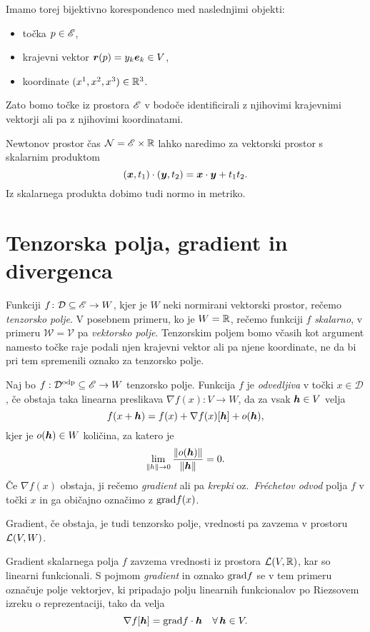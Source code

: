 Imamo torej bijektivno korespondenco med naslednjimi objekti:
\begin{itemize}
	\item točka $p\in\mathscr E$,
	\item krajevni vektor $\boldsymbol r(p)=y_k\boldsymbol e_k\in V$,
	\item koordinate $(x^1,x^2,x^3)\in\mathbb R^3$.
\end{itemize}
Zato bomo točke iz prostora $\mathscr E$ v bodoče identificirali z njihovimi krajevnimi vektorji ali pa z njihovimi koordinatami.

Newtonov prostor čas $\mathcal{N}=\mathscr E\times\mathbb R$ lahko naredimo za vektorski prostor s skalarnim produktom
\[ (\boldsymbol x,t_1)\cdot(\boldsymbol y,t_2) = \boldsymbol x\cdot\boldsymbol y + t_1 t_2. \]
Iz skalarnega produkta dobimo tudi normo in metriko.


\section{Tenzorska polja, gradient in divergenca}


Funkciji $f\colon\mathcal{D}\subseteq\mathscr E\to W$, kjer je $W$ neki normirani vektorski prostor, rečemo
\emph{tenzorsko polje}. V posebnem primeru, ko je $W=\mathbb R$, rečemo funkciji $f$ \emph{skalarno},
v primeru $\mathscr{W}=\mathscr{V}$ pa \emph{vektorsko polje}. Tenzorskim poljem bomo včasih kot argument namesto točke raje
podali njen krajevni vektor ali pa njene koordinate, ne da bi pri tem spremenili oznako za tenzorsko polje.

\begin{definicija}
	Naj bo $f:\mathcal{D}^{\mathrm{odp}}\subseteq\mathscr E\to W$ tenzorsko polje. Funkcija $f$ je \emph{odvedljiva}
	v točki $x\in\mathcal{D}$, če obstaja taka linearna preslikava $\nabla f(x):V\to W$, da za vsak $\boldsymbol h\in V$ velja
	\begin{equation*}
		f(x+\boldsymbol h)=f(x)+\nabla f(x)[\boldsymbol h]+o(\boldsymbol h),
	\end{equation*}
	kjer je $o(\boldsymbol h)\in W$ količina, za katero je
	\[ \lim_{\| h\|\to 0}\frac{\|o(\boldsymbol h)\|}{\|\boldsymbol h\|}=0. \]
	Če $\nabla f(x)$ obstaja, ji rečemo \emph{gradient} ali pa \emph{krepki} oz.~\emph{Fréchetov odvod} polja $f$ v točki $x$
	in ga običajno označimo z $\mathrm{grad} f(x)$.
\end{definicija}
Gradient, če obstaja, je tudi tenzorsko polje, vrednosti pa zavzema v prostoru $\mathcal L(V,W)$.

Gradient skalarnega polja $f$ zavzema vrednosti iz prostora $\mathcal L(V,\mathbb R)$, kar so linearni funkcionali.
S pojmom \emph{gradient} in oznako $\mathrm{grad} f$ se v tem primeru označuje polje vektorjev, ki pripadajo polju
linearnih funkcionalov po Riezsovem izreku o reprezentaciji, tako da velja
\[ \nabla f[\boldsymbol h]=\mathrm{grad} f \cdot \boldsymbol h \quad \forall\, \boldsymbol h\in V. \]

